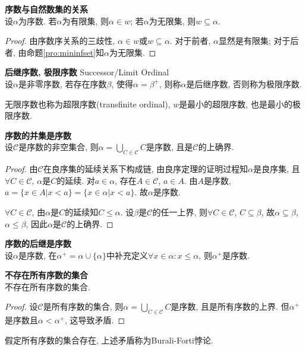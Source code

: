 \begin{col} \textbf{序数与自然数集的关系}\\
设$\alpha$为序数. 若$\alpha$为有限集, 则$\alpha \in w$; 若$\alpha$为无限集, 则$w\subseteq \alpha$.
\label{col:inford_nat}
\end{col}
\begin{proof}
由序数序关系的三歧性, $\alpha\in w$或$w\subseteq \alpha$. 对于前者, $\alpha$显然是有限集; 对于后者, 由命题\ref{pro:mininfset}知$\alpha$为无限集. 
\end{proof}

\begin{dfn}\textbf{后继序数, 极限序数} Successor/Limit Ordinal\\
设$\alpha$是非零序数, 若存在序数$\beta$, 使得$\alpha=\beta^+$, 则称$\alpha$是后继序数, 否则称为极限序数. 
\end{dfn}
无限序数也称为超限序数(transfinite ordinal), $w$是最小的超限序数, 也是最小的极限序数.

\begin{pro} \textbf{序数的并集是序数}\\
设$\mathcal{C}$是序数的非空集合, 则$\alpha=\bigcup_{C\in \mathcal{C}}C$是序数, 且是$\mathcal{C}$的上确界. 
\end{pro}
\begin{proof}
\par 由$\mathcal{C}$在良序集的延续关系下构成链, 由良序定理的证明过程知$\alpha$是良序集, 且$\forall C\in \mathcal{C}$, $\alpha$是$C$的延续. 对$a\in \alpha$, 存在$A\in \mathcal{C}$, $a\in A$. 由$A$是序数, $a=\{x\in A\vert x<a\}=\{x\in \alpha \vert x<a\}$. 故$\alpha$是序数. 
\par $\forall C\in \mathcal{C}$, 由$\alpha$是$C$的延续知$C\le \alpha$. 设$\beta$是$\mathcal{C}$的任一上界, 则$\forall C\in \mathcal{C}$, $C\subseteq \beta$, 故$\alpha \subseteq \beta$, $\alpha\le \beta$, 因此$\alpha$是$\mathcal{C}$的上确界. 
\end{proof}

\begin{pro} \textbf{序数的后继是序数}\\
设$\alpha$是序数, 在$\alpha^+=\alpha \cup \{\alpha\}$中补充定义$\forall x\in \alpha: x\le \alpha$, 则$\alpha^+$是序数. 
\end{pro}

\begin{col} \textbf{不存在所有序数的集合}\\
不存在所有序数的集合. 
\end{col}
\begin{proof}
设$\mathcal{C}$是所有序数的集合, 则$\alpha =\bigcup_{C\in \mathcal{C}}C$是序数, 且是所有序数的上界. 但$\alpha^+$是序数且$\alpha<\alpha^+$, 这导致矛盾. 
\end{proof}
\par 假定所有序数的集合存在, 上述矛盾称为Burali-Forti悖论.

